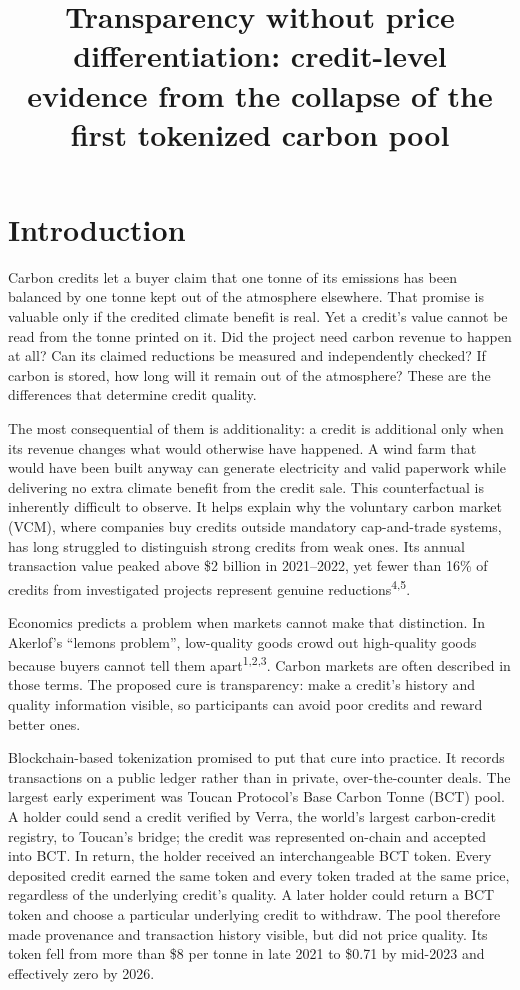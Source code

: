 \documentclass[sn-nature,Numbered]{sn-jnl}
\title[Article]{Transparency without price differentiation: credit-level evidence from the collapse of the first tokenized carbon pool}
\author*[1]{\fnm{Wei} \sur{Cai}}\email{weicaics@uw.edu}
\author[1]{\fnm{Adeline} \sur{Wen}}\email{ywen8@uw.edu}
\begin{document}
\flushbottom
\maketitle


\section*{Introduction}
Carbon credits let a buyer claim that one tonne of its emissions has been balanced by one tonne kept out of the atmosphere elsewhere. That promise is valuable only if the credited climate benefit is real. Yet a credit's value cannot be read from the tonne printed on it. Did the project need carbon revenue to happen at all? Can its claimed reductions be measured and independently checked? If carbon is stored, how long will it remain out of the atmosphere? These are the differences that determine credit quality.

The most consequential of them is additionality: a credit is additional only when its revenue changes what would otherwise have happened. A wind farm that would have been built anyway can generate electricity and valid paperwork while delivering no extra climate benefit from the credit sale. This counterfactual is inherently difficult to observe. It helps explain why the voluntary carbon market (VCM), where companies buy credits outside mandatory cap-and-trade systems, has long struggled to distinguish strong credits from weak ones. Its annual transaction value peaked above \$2 billion in 2021--2022, yet fewer than 16\% of credits from investigated projects represent genuine reductions\textsuperscript{4,5}.

Economics predicts a problem when markets cannot make that distinction. In Akerlof's ``lemons problem'', low-quality goods crowd out high-quality goods because buyers cannot tell them apart\textsuperscript{1,2,3}. Carbon markets are often described in those terms. The proposed cure is transparency: make a credit's history and quality information visible, so participants can avoid poor credits and reward better ones.

Blockchain-based tokenization promised to put that cure into practice. It records transactions on a public ledger rather than in private, over-the-counter deals. The largest early experiment was Toucan Protocol's Base Carbon Tonne (BCT) pool. A holder could send a credit verified by Verra, the world's largest carbon-credit registry, to Toucan's bridge; the credit was represented on-chain and accepted into BCT. In return, the holder received an interchangeable BCT token. Every deposited credit earned the same token and every token traded at the same price, regardless of the underlying credit's quality. A later holder could return a BCT token and choose a particular underlying credit to withdraw. The pool therefore made provenance and transaction history visible, but did not price quality. Its token fell from more than \$8 per tonne in late 2021 to \$0.71 by mid-2023 and effectively zero by 2026.
\end{document}
